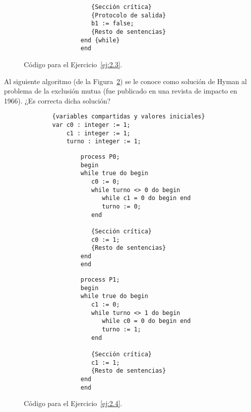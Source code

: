 \begin{ejercicio}
\begin{figure}
\begin{multicols}{2}
\begin{verbatim}
                   {Sección crítica}
                   {Protocolo de salida}
                   b1 := false;
                   {Resto de sentencias}
                end {while}
                end
            \end{verbatim}
        \end{multicols}
        \caption{Código para el Ejercicio~\ref{ej:2.3}.}
        \label{fig:cod_3}
    \end{figure}
\end{ejercicio}

\begin{ejercicio}\label{ej:2.4}
    Al siguiente algoritmo (de la Figura~\ref{fig:cod_4}) se le conoce como solución de Hyman al problema de la exclusión mutua (fue publicado en una revista de impacto en 1966). ¿Es correcta dicha solución?
    \begin{figure}
        \centering
        \begin{verbatim}
        {variables compartidas y valores iniciales}
        var c0 : integer := 1;
            c1 : integer := 1;
            turno : integer := 1;
        \end{verbatim}
        \setlength{\columnsep}{1cm}
        \begin{multicols}{2}
            \begin{verbatim}
                process P0;
                begin
                while true do begin
                   c0 := 0;
                   while turno <> 0 do begin
                      while c1 = 0 do begin end
                      turno := 0;
                   end

                   {Sección crítica}
                   c0 := 1;
                   {Resto de sentencias}
                end
                end
            \end{verbatim}
            \begin{verbatim}
                process P1;
                begin
                while true do begin
                   c1 := 0;
                   while turno <> 1 do begin
                      while c0 = 0 do begin end
                      turno := 1;
                   end

                   {Sección crítica}
                   c1 := 1;
                   {Resto de sentencias}
                end
                end
            \end{verbatim}
        \end{multicols}
        \caption{Código para el Ejercicio~\ref{ej:2.4}.}
        \label{fig:cod_4}
    \end{figure}
\end{ejercicio}

